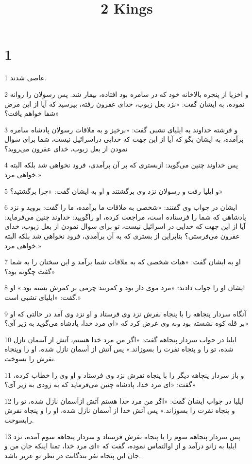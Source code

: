

\title{2 Kings}

 
\chapter{1}

\par 1 عاصی شدند.
\par 2 و اخزیا از پنجره بالاخانه خود که در سامره بود افتاده، بیمار شد. پس رسولان را روانه نموده، به ایشان گفت: «نزد بعل زبوب، خدای عقرون رفته، بپرسید که آیا از این مرض شفا خواهم یافت؟»
\par 3 و فرشته خداوند به ایلیای تشبی گفت: «برخیز و به ملاقات رسولان پادشاه سامره برآمده، به ایشان بگو که آیا از این جهت که خدایی دراسرائیل نیست، شما برای سوال نمودن از بعل زبوب، خدای عقرون می‌روید؟
\par 4 پس خداوند چنین می‌گوید: ازبستری که بر آن برآمدی، فرود نخواهی شد بلکه البته خواهی مرد.»
\par 5 و ایلیا رفت و رسولان نزد وی برگشتند و او به ایشان گفت: «چرا برگشتید؟»
\par 6 ایشان در جواب وی گفتند: «شخصی به ملاقات ما برآمده، ما را گفت: بروید و نزد پادشاهی که شما را فرستاده است، مراجعت کرده، او راگویید: خداوند چنین می‌فرماید: آیا از این جهت که خدایی در اسرائیل نیست، تو برای سوال نمودن از بعل زبوب، خدای عقرون می‌فرستی؟ بنابراین از بستری که به آن برآمدی، فرود نخواهی شد بلکه البته خواهی مرد.»
\par 7 او به ایشان گفت: «هیات شخصی که به ملاقات شما برآمد و این سخنان را به شما گفت چگونه بود؟»
\par 8 ایشان او را جواب دادند: «مرد موی دار بود و کمربند چرمی بر کمرش بسته بود.» او گفت: «ایلیای تشبی است.»
\par 9 آنگاه سردار پنجاهه را با پنجاه نفرش نزد وی فرستاد و او نزد وی آمد در حالتی که او بر قله کوه نشسته بود وبه وی عرض کرد که «ای مرد خدا، پادشاه می‌گوید به زیر آی؟»
\par 10 ایلیا در جواب سردار پنجاهه گفت: «اگر من مرد خدا هستم، آتش از آسمان نازل شده، تو را و پنجاه نفرت را بسوزاند.» پس آتش از آسمان نازل شده، او را وپنجاه نفرش را بسوخت.
\par 11 و باز سردار پنجاهه دیگر را با پنجاه نفرش نزد وی فرستاد و او وی را خطاب کرده، گفت: «ای مرد خدا، پادشاه چنین می‌فرماید که به زودی به زیر آی؟»
\par 12 ایلیا در جواب ایشان گفت: «اگر من مرد خدا هستم آتش ازآسمان نازل شده، تو را و پنجاه نفرت را بسوزاند.» پس آتش خدا از آسمان نازل شده، او را و پنجاه نفرش رابسوخت.
\par 13 پس سردار پنجاهه سوم را با پنجاه نفرش فرستاد و سردار پنجاهه سوم آمده، نزد ایلیا به زانو درآمد و از اوالتماس نموده، گفت که «ای مرد خدا، تمنا اینکه جان من و جان این پنجاه نفر بندگانت در نظر تو عزیز باشد.
